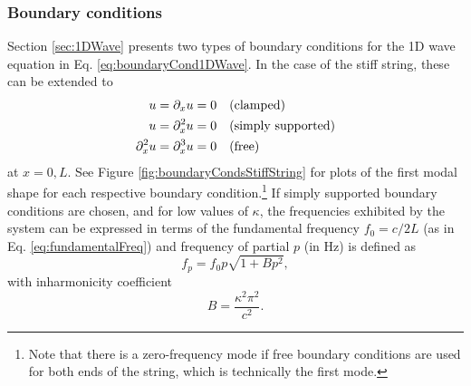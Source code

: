 \subsubsection{Boundary conditions}
Section \ref{sec:1DWave} presents two types of boundary conditions for the 1D wave equation in Eq. \eqref{eq:boundaryCond1DWave}. In the case of the stiff string, these can be extended to
\begin{subequations}\label{eq:stiffStringBoundConds}
    \begin{align}
        u = \partial_x u &= 0 \quad \text{(clamped)}\label{eq:BCclamped}\\
        u = \partial_x^2 u &= 0 \quad \text{(simply supported)}\label{eq:BCsimplySupported}\\
        \partial_x^2 u = \partial_x^3 u &= 0 \quad \text{(free)}\label{eq:BCfree}
    \end{align}
\end{subequations}
at $x = 0, L$. See Figure \ref{fig:boundaryCondsStiffString} for plots of the first modal shape for each respective boundary condition.\footnote{Note that there is a zero-frequency mode if free boundary conditions are used for both ends of the string, which is technically the first mode.} If simply supported boundary conditions are chosen, and for low values of $\kappa$, the frequencies exhibited by the system can be expressed in terms of the fundamental frequency $f_0 = c/2L$ (as in Eq. \eqref{eq:fundamentalFreq}) and frequency of partial $p$ (in Hz) is defined as \cite{Fletcher1964}
\begin{equation}\label{eq:inharmonicityEquation}
    f_p = f_0 p \sqrt{1 + B p^2},
\end{equation}
with inharmonicity coefficient 
\begin{equation*}
    B = \frac{\kappa^2 \pi^2}{c^2}.
\end{equation*}
\def\figWidth{0.32}
